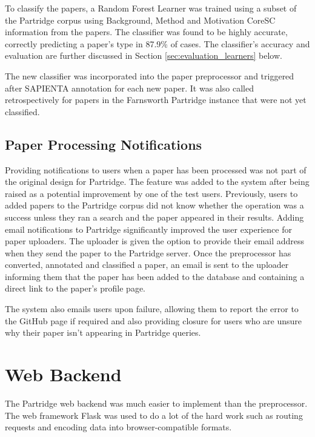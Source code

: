 To classify the papers, a Random Forest Learner was trained using a subset of
the Partridge corpus using Background, Method and Motivation CoreSC information
from the papers. The classifier was found to be highly accurate, correctly
predicting a paper's type in 87.9\% of cases. The classifier's accuracy and
evaluation are further discussed in Section \ref{sec:evaluation_learners}
below. 

The new classifier was incorporated into the paper preprocessor and triggered
after SAPIENTA annotation for each new paper. It was also called
retrospectively for papers in the Farnsworth Partridge instance that were not yet
classified.


\subsection{ Paper Processing Notifications }

Providing notifications to users when a paper has been processed was not part
of the original design for Partridge. The feature was added to the system after
being raised as a potential improvement by one of the test users. Previously,
users to added papers to the Partridge corpus did not know whether the
operation was a success unless they ran a search and the paper appeared in
their results. Adding email notifications to Partridge significantly improved
the user experience for paper uploaders. The uploader is given the option to
provide their email address when they send the paper to the Partridge server.
Once the preprocessor has converted, annotated and classified a paper, an email
is sent to the uploader informing them that the paper has been added to the
database and containing a direct link to the paper's profile page.

The system also emails users upon failure, allowing them to report the error to
the GitHub page if required and also providing closure for users who are unsure
why their paper isn't appearing in Partridge queries.



\section{ Web Backend }

The Partridge web backend was much easier to implement than the preprocessor.
The web framework Flask was used to do a lot of the hard work such as routing
requests and encoding data into browser-compatible formats.

